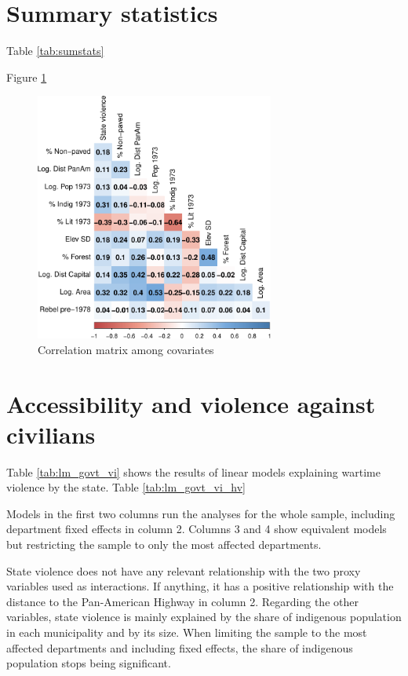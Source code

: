 \documentclass[a4paper, 12pt, notitlepage]{article}
\begin{document}
\clearpage
\section{Summary statistics}\label{app:stats}

Table \ref{tab:sumstats}

Figure \ref{fig:corrplot}



\begin{figure}[htb!]
  \centering
    \includegraphics[width = 0.7\textwidth]{img/corrplot}

  \caption{Correlation matrix among covariates} \label{fig:corrplot}

\end{figure}

\clearpage
\section{Accessibility and violence against civilians}\label{app:lm_violence}

Table \ref{tab:lm_govt_vi} shows the results of linear models explaining wartime violence by the state.
Table \ref{tab:lm_govt_vi_hv}


Models in the first two columns run the analyses for the whole sample, including department fixed effects in column 2.
Columns 3 and 4 show equivalent models but restricting the sample to only the most affected departments.

State violence does not have any relevant relationship with the two proxy variables used as interactions.
If anything, it has a positive relationship with the distance to the Pan-American Highway in column 2.
Regarding the other variables, state violence is mainly explained by the share of indigenous population in each municipality and by its size.
When limiting the sample to the most affected departments and including fixed effects, the share of indigenous population stops being significant.
\end{document}
